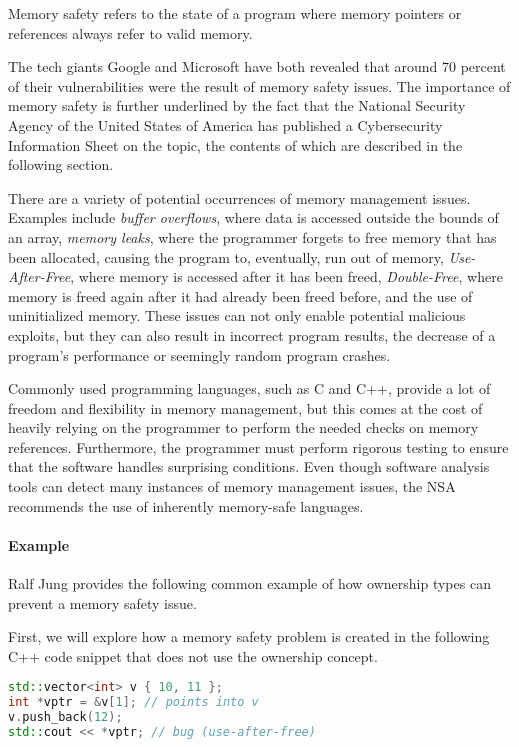 \documentclass[sigplan,11pt,nonacm]{acmart}
\begin{document}
Memory safety refers to the state of a program where memory pointers or references always refer to valid memory.

The tech giants Google \cite{google-memory-safety} and Microsoft \cite{microsoft-memory-safety} have both revealed that around 70 percent of their vulnerabilities were the result of memory safety issues.
The importance of memory safety is further underlined by the fact that the National Security Agency of the United States of America has published a Cybersecurity Information Sheet \cite{nsa-memory-safety} on the topic, the contents of which are described in the following section.

There are a variety of potential occurrences of memory management issues.
Examples include \emph{buffer overflows}, where data is accessed outside the bounds of an array, \emph{memory leaks}, where the programmer forgets to free memory that has been allocated, causing the program to, eventually, run out of memory, \emph{Use-After-Free}, where memory is accessed after it has been freed, \emph{Double-Free}, where memory is freed again after it had already been freed before, and the use of uninitialized memory.
These issues can not only enable potential malicious exploits, but they can also result in incorrect program results, the decrease of a program's performance or seemingly random program crashes.

Commonly used programming languages, such as C and C++, provide a lot of freedom and flexibility in memory management, but this comes at the cost of heavily relying on the programmer to perform the needed checks on memory references.
Furthermore, the programmer must perform rigorous testing to ensure that the software handles surprising conditions.
Even though software analysis tools can detect many instances of memory management issues, the NSA recommends the use of inherently memory-safe languages.


\paragraph{Example}

Ralf Jung \cite{understanding-evolving-rust} provides the following common example of how ownership types can prevent a memory safety issue.

First, we will explore how a memory safety problem is created in the following C++ code snippet that does not use the ownership concept.

\begin{lstlisting}[language=C++,captionpos=b,caption={C++ use-after-free}]
std::vector<int> v { 10, 11 };
int *vptr = &v[1]; // points into v
v.push_back(12);
std::cout << *vptr; // bug (use-after-free)
\end{lstlisting}
\end{document}
